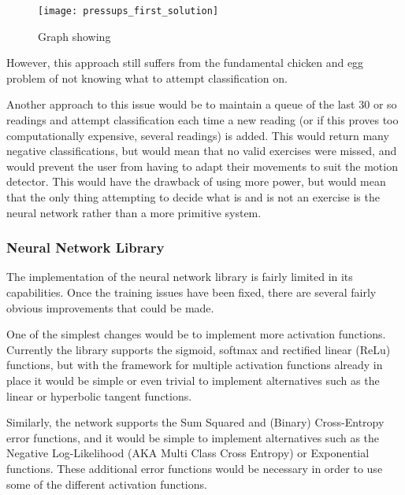 \documentclass[a4paper]{article}
\begin{document}
\begin{figure}[H]
    \centering
        \texttt{[image: pressups\_first\_solution]}
        \caption{Graph showing }
        \label{fig:pu_false_positive}
\end{figure}

However, this approach still suffers from the fundamental chicken and egg problem of not knowing what to attempt classification on.

Another approach to this issue would be to maintain a queue of the last 30 or so readings and attempt classification each time a new reading (or if this proves too computationally expensive, several readings) is added. 
This would return many negative classifications, but would mean that no valid exercises were missed, and would prevent the user from having to adapt their movements to suit the motion detector. This would have the drawback of using more power, but would mean that the only thing attempting to decide what is and is not an exercise is the neural network rather than a more primitive system.


\subsubsection{Neural Network Library}

The implementation of the neural network library is fairly limited in its capabilities. Once the training issues have been fixed, there are several fairly obvious improvements that could be made.

One of the simplest changes would be to implement more activation functions. Currently the library supports the sigmoid, softmax  and rectified linear (ReLu) functions, but with the framework for multiple activation functions already in place it would be simple or even trivial to implement alternatives such as the linear or hyperbolic tangent functions.

Similarly, the network supports the Sum Squared and (Binary) Cross-Entropy error functions, and it would be simple to implement alternatives such as the Negative Log-Likelihood (AKA Multi Class Cross Entropy) or Exponential functions. These additional error functions would be necessary in order to use some of the different activation functions. 
\end{document}
